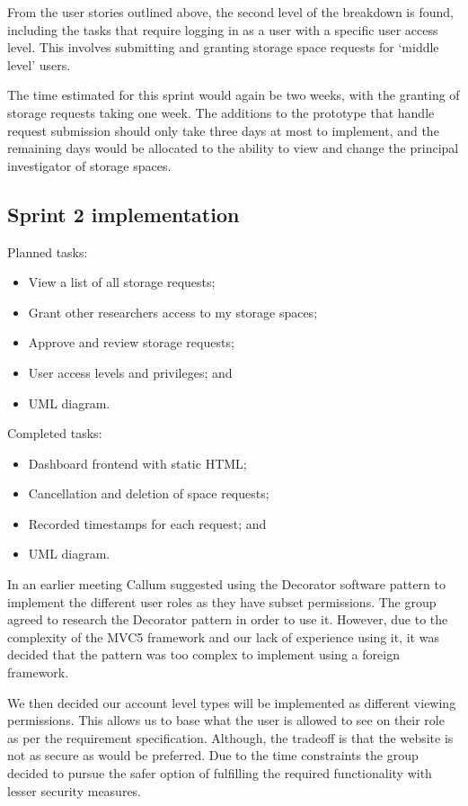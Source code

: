 \documentclass[a4paper,titlepage,12pt]{article}
\begin{document}
From the user stories outlined above, the second level of the breakdown is
found, including the tasks that require logging in as a user with a specific
user access level. This involves submitting and granting storage space requests
for `middle level' users.

The time estimated for this sprint would again be two weeks, with the granting
of storage requests taking one week. The additions to the prototype that handle
request submission should only take three days at most to implement, and the
remaining days would be allocated to the ability to view and change the
principal investigator of storage spaces.

\subsection{Sprint 2 implementation}

Planned tasks:

\begin{itemize}
	\item View a list of all storage requests;
	\item Grant other researchers access to my storage spaces;
	\item Approve and review storage requests;
	\item User access levels and privileges; and
	\item UML diagram.
\end{itemize}

Completed tasks:

\begin{itemize}
	\item Dashboard frontend with static HTML;
	\item Cancellation and deletion of space requests;
	\item Recorded timestamps for each request; and
	\item UML diagram.
\end{itemize}

In an earlier meeting Callum suggested using the Decorator software pattern to
implement the different user roles as they have subset permissions. The group
agreed to research the Decorator pattern in order to use it. However, due to
the complexity of the MVC5 framework and our lack of experience using it, it
was decided that the pattern was too complex to implement using a foreign
framework.

We then decided our account level types will be implemented as different
viewing permissions. This allows us to base what the user is allowed to see on
their role as per the requirement specification. Although, the tradeoff is that
the website is not as secure as would be preferred. Due to the time constraints
the group decided to pursue the safer option of fulfilling the required
functionality with lesser security measures.
\end{document}
